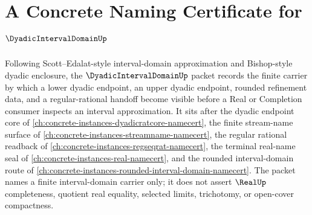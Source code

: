 \chapter{A Concrete Naming Certificate for $\DyadicIntervalDomainUp$}
\label{ch:concrete-instances-dyadic-interval-domain-namecert}

Following Scott--Edalat-style interval-domain approximation and Bishop-style dyadic enclosure, the $\DyadicIntervalDomainUp$ packet records the finite carrier by which a lower dyadic endpoint, an upper dyadic endpoint, rounded refinement data, and a regular-rational handoff become visible before a Real or Completion consumer inspects an interval approximation. It sits after the dyadic endpoint core of \autoref{ch:concrete-instances-dyadicratcore-namecert}, the finite stream-name surface of \autoref{ch:concrete-instances-streamname-namecert}, the regular rational readback of \autoref{ch:concrete-instances-regseqrat-namecert}, the terminal real-name seal of \autoref{ch:concrete-instances-real-namecert}, and the rounded interval-domain route of \autoref{ch:concrete-instances-rounded-interval-domain-namecert}. The packet names a finite interval-domain carrier only; it does not assert $\RealUp$ completeness, quotient real equality, selected limits, trichotomy, or open-cover compactness.

